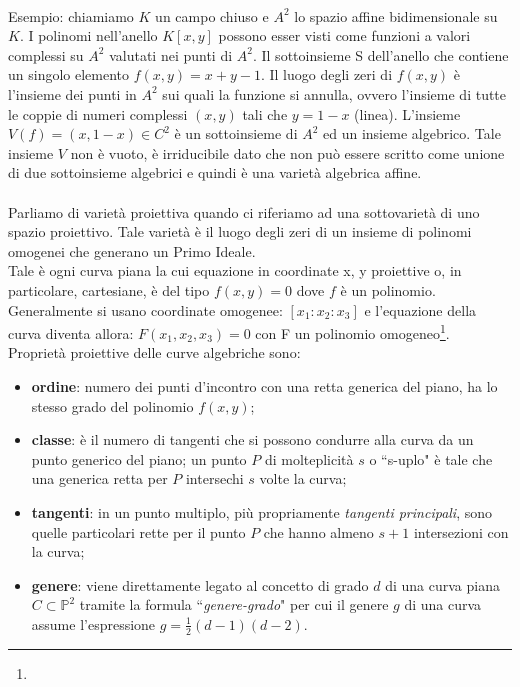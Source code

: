 \documentclass[a4paper,12pt]{tesiinfo}
\newcommand\ddfrac[2]{\frac{\displaystyle #1}{\displaystyle #2}}
\renewcommand{\footnotesize}{\fontsize{9pt}{11pt}\selectfont}
\begin{document}
\\
Esempio: chiamiamo $K$ un campo chiuso e $A^2$ lo spazio affine bidimensionale su $K$. I polinomi nell'anello $K[x, y]$ possono esser visti come funzioni a valori complessi su $A^2$ valutati nei punti di $A^2$. Il sottoinsieme S dell'anello che contiene un singolo elemento $f(x, y) = x + y - 1$. Il luogo degli zeri di $f(x, y)$ \`e l'insieme dei punti in $A^2$ sui quali la funzione si annulla, ovvero l'insieme di tutte le coppie di numeri complessi $(x, y)$ tali che $y = 1 - x$ (linea). L'insieme $V(f) = {(x, 1-x) \in C^2}$ \`e un sottoinsieme di $A^2$ ed un insieme algebrico. Tale insieme $V$ non \`e vuoto, \`e irriducibile dato che non pu\`o essere scritto come unione di due sottoinsieme algebrici e quindi \`e una variet\`a algebrica affine.
%
%
%
\\\\
Parliamo di variet\`a proiettiva quando ci riferiamo ad una sottovariet\`a di uno spazio proiettivo. Tale variet\`a \`e il luogo degli zeri di un insieme di polinomi omogenei che generano un Primo Ideale.
\\
Tale \`e ogni curva piana la cui equazione in coordinate x, y proiettive o, in particolare, cartesiane, \`e del tipo $f (x, y)=0$ dove $f$ \`e un polinomio. Generalmente si usano coordinate omogenee: $[x_1 : x_2 : x_3 ]$ e l'equazione della curva diventa allora: $F(x_1 , x_2 , x_3 )=0$ con F un polinomio omogeneo\footnote{\footnotesize{Tutte le variabili del polinomio hanno il medesimo grado}}.
Propriet\`a proiettive delle curve algebriche sono: 
\begin{itemize}
 \item \textbf{ordine}: numero dei punti d'incontro con una retta generica del piano, ha lo stesso grado del polinomio $f (x, y)$; 
 \item \textbf{classe}: \`e il numero di tangenti che si possono condurre alla curva da un punto generico del piano; un punto $P$ di molteplicit\`a $s$ o ``s-uplo" \`e tale che una generica retta per $P$ intersechi $s$ volte la curva;
 \item \textbf{tangenti}: in un punto multiplo, pi\`u propriamente \textit{tangenti principali}, sono quelle particolari rette per il punto $P$ che hanno almeno $s + 1$ intersezioni con la curva; 
 \item \textbf{genere}: viene direttamente legato al concetto di grado $d$ di una curva piana $C \subset \mathbb{P}^2$ tramite la formula ``\textit{genere-grado}" per cui il genere $g$ di una curva assume
 l'espressione $g = \ddfrac{1}{2} (d-1)(d-2)$.
\end{itemize} 
\end{document}
